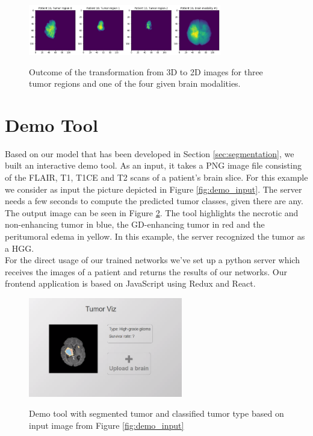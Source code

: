 \documentclass[a4paper,12pt,pagesize,headsepline,bibtotoc,titlepage]{scrartcl}
\begin{document}
\begin{figure}[!h]
\begin{center}
\includegraphics*[width=0.75\textwidth]{images/tumor_2d.png}\\
\caption{Outcome of the transformation from 3D to 2D images for three tumor regions and one of the four given brain modalities.}
\label{fig:tumor_2d}
\end{center}
\end{figure}

\section{Demo Tool}
\label{sec:demo}
Based on our model that has been developed in Section \ref{sec:segmentation}, we built an interactive demo tool.
As an input, it takes a PNG image file consisting of the FLAIR, T1, T1CE and T2 scans of a patient's brain slice.
For this example we consider as input the picture depicted in Figure \ref{fig:demo_input}.
The server needs a few seconds to compute the predicted tumor classes, given there are any.
The output image can be seen in Figure \ref{fig:demo_output}.
The tool highlights the necrotic and non-enhancing tumor in blue, the GD-enhancing tumor in red and the peritumoral edema in yellow.
In this example, the server recognized the tumor as a HGG. \\
For the direct usage of our trained networks we've set up a python server which receives the images of a patient and returns the results of our networks.
Our frontend application is based on JavaScript using Redux and React.

\begin{figure}[!h]
\begin{center}
\includegraphics*[width=0.6\textwidth]{images/demo_output.png}\\
\caption{Demo tool with segmented tumor and classified tumor type based on input image from Figure \ref{fig:demo_input}}
\label{fig:demo_output}
\end{center}
\end{figure}
\end{document}
